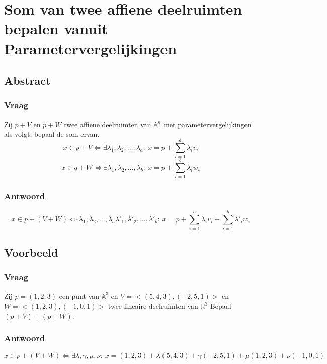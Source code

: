 \documentclass[main.tex]{subfiles}
\begin{document}
\newpage
\section{Som van twee affiene deelruimten bepalen vanuit Parametervergelijkingen}
\subsection{Abstract}
\subsubsection{Vraag}
\begin{center}
  Zij $p+V$ en $p+W$ twee affiene deelruimten van $\mathbb{A}^{n}$ met parametervergelijkingen als volgt, bepaal de som ervan.
  \[ x\in p+V \Leftrightarrow \exists \lambda_{1},\lambda_{2},\dotsc,\lambda_{a}:\ x = p + \sum_{i=1}^{a}\lambda_{i}v_{i} \]
  \[ x\in q+W \Leftrightarrow \exists \lambda_{1},\lambda_{2},\dotsc,\lambda_{b}:\ x = p + \sum_{i=1}^{b}\lambda_{i}w_{i} \]
\end{center}

\subsubsection{Antwoord}
\[ x \in p+(V+W)  \Leftrightarrow \lambda_{1},\lambda_{2},\dotsc,\lambda_{a}\lambda'_{1},\lambda'_{2},\dotsc,\lambda'_{b}:\ x = p + \sum_{i=1}^{a}\lambda_{i}v_{i}+ \sum_{i=1}^{b}\lambda'_{i}w_{i}\]

\subsection{Voorbeeld}
\subsubsection{Vraag}
\begin{center}
  Zij $p=(1,2,3)$ een punt van $\mathbb{A}^{3}$ en $V=<(5,4,3),(-2,5,1)>$ en $W=<(1,2,3),(-1,0,1)>$ twee lineaire deelruimten van $\mathbb{R}^{3}$
  Bepaal $(p+V) + (p+W)$.
\end{center}

\subsubsection{Antwoord}
\[
x\in p+(V+W) \Leftrightarrow \exists \lambda, \gamma, \mu, \nu:\ 
x = (1,2,3) + \lambda (5,4,3) + \gamma (-2,5,1) + \mu (1,2,3) + \nu (-1,0,1)
\]
\end{document}
